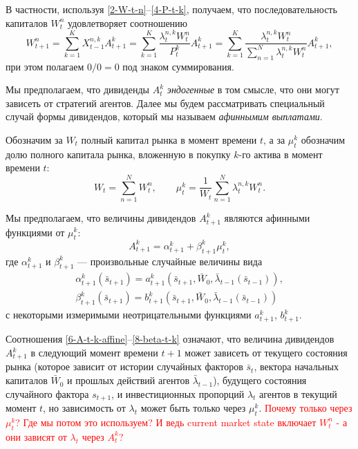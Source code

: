 \documentclass[a4paper,12pt,russian]{article} %
\theoremstyle{definition}
\begin{document}
В частности, используя \eqref{2-W-t-n}--\eqref{4-P-t-k}, получаем, что последовательность капиталов $W_t^n$ удовлетворяет соотношению
\begin{equation}
\label{5-dynamics-of-W}
W_{t+1}^n = \sum_{k=1}^K 
X_{t-1}^{n,k} A_{t+1}^k =
\sum_{k=1}^K \frac{\lambda_{t}^{n,k} W_t^n}{P_t^k} A_{t+1}^k=
\sum_{k=1}^K \frac{\lambda_{t}^{n,k} W_t^n}{\sum_{n=1}^N \lambda_{t}^{n,k} W_t^n} A_{t+1}^k,
\end{equation}
при этом полагаем $0/0=0$ под знаком суммирования. 

Мы предполагаем, что дивиденды $A_{t}^k$ \emph{эндогенные} в том смысле, что они могут зависеть от стратегий агентов. Далее мы будем рассматривать специальный случай формы дивидендов, который мы называем \textit{афиннымим выплатами}.

Обозначим за $W_t$ полный капитал рынка в момент времени $t$, а за $\mu_{t}^k$ обозначим долю полного капитала рынка, вложенную в покупку $k$-го актива в момент времени $t$:
\[
W_t = \sum_{n=1}^N W_t^n, \qquad
\mu_{t}^k = \frac{1}{W_t}\sum_{n=1}^{N}\lambda_{t}^{n,k} W_t^n.
\]

Мы предполагаем, что величины дивидендов $A_{t+1}^k$ 
являются афинными функциями от $\mu_{t}^k$:
\begin{equation}
\label{6-A-t-k-affine}
A_{t+1}^k = \alpha_{t+1}^k + \beta_{t+1}^k \mu_{t}^k,
\end{equation}
где $\alpha_{t+1}^k$ и $\beta_{t+1}^k$ — произвольные случайные величины вида
\begin{gather}
\label{7-alpha-t-k}
\alpha_{t+1}^k( \bar s_{t+1}) = a_{t+1}^k( \bar s_{t+1}, \bar W_0, \bar \lambda_{t-1}( \bar s_{t-1} )), \\
\label{8-beta-t-k}
\beta_{t+1}^k( \bar s_{t+1} ) = b_{t+1}^k ( \bar s_{t+1},\bar W_0, \bar\lambda_{t-1}( \bar s_{t-1} ))
\end{gather}
с некоторыми измеримыми неотрицательными функциями $a_{t+1}^k$, $b_{t+1}^k$.

Соотношения \eqref{6-A-t-k-affine}--\eqref{8-beta-t-k} означают, что величина дивидендов $A_{t+1}^k$ в следующий момент времени $t+1$ может зависеть от текущего состояния рынка (которое зависит от истории случайных факторов $\bar s_{t}$, вектора начальных капиталов $\bar W_0$ и прошлых действий агентов $\bar \lambda_{t-1}$), будущего состояния случайного фактора $s_{t+1}$, и инвестиционных пропорций $ \lambda_t$ агентов в текущий момент $t$, но зависимость от $\lambda_t$ может быть только через $\mu_{t}^k$. \textcolor{red} {Почему только через $\mu_{t}^k$? Где мы потом это используем? И ведь current market state включает $W_t^n$ - а они зависят от $\lambda_t$ через $A_t^k$?}
\end{document}
